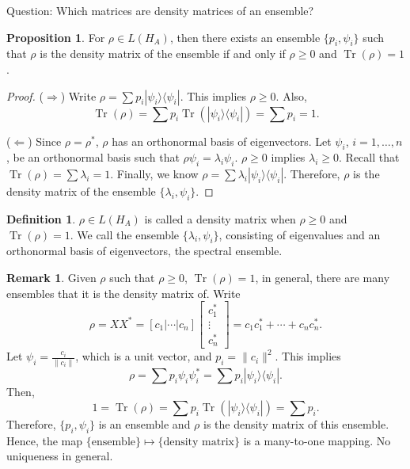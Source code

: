 \documentclass[12pt]{article}
\theoremstyle{definition}
\newtheorem*{proposition}{Proposition}
\newtheorem*{definition}{Definition}
\newtheorem*{remark}{Remark}
\newcommand{\ketbra}[2]{|#1\rangle\langle #2|}
\DeclareMathOperator{\Tr}{Tr}
\begin{document}
Question: Which matrices are density matrices of an ensemble?

\begin{proposition}
For $\rho \in L(H_A)$, then there exists an ensemble $\{p_i,\psi_i\}$ such that $\rho$ is the density matrix of the ensemble if and only if $\rho \geq 0$ and $\Tr(\rho) = 1$.
\end{proposition}

\begin{proof}
($\Rightarrow$) Write $\rho = \sum p_i \ketbra{\psi_i}{\psi_i}$. This implies $\rho \geq 0$. Also,
\[
\Tr(\rho) = \sum p_i \Tr(\ketbra{\psi_i}{\psi_i}) = \sum p_i = 1.
\]

($\Leftarrow$) Since $\rho = \rho^*$, $\rho$ has an orthonormal basis of eigenvectors. Let $\psi_i$, $i = 1,\ldots,n$, be an orthonormal basis such that $\rho\psi_i = \lambda_i\psi_i$. $\rho \geq 0$ implies $\lambda_i \geq 0$. Recall that $\Tr(\rho) = \sum \lambda_i = 1$. Finally, we know $\rho = \sum \lambda_i \ketbra{\psi_i}{\psi_i}$. Therefore, $\rho$ is the density matrix of the ensemble $\{\lambda_i,\psi_i\}$.
\end{proof}

\begin{definition}
$\rho \in L(H_A)$ is called a density matrix when $\rho \geq 0$ and $\Tr(\rho) = 1$. We call the ensemble $\{\lambda_i,\psi_i\}$, consisting of eigenvalues and an orthonormal basis of eigenvectors, the spectral ensemble.
\end{definition}

\begin{remark}
Given $\rho$ such that $\rho \geq 0$, $\Tr(\rho) = 1$, in general, there are many ensembles that it is the density matrix of. Write
\[
\rho = XX^* = [c_1|\cdots|c_n]\begin{bmatrix}c_1^*\\ \vdots \\ c_n^*\end{bmatrix} = c_1c_1^* + \cdots + c_nc_n^*.
\]
Let $\psi_i = \frac{c_i}{\|c_i\|}$, which is a unit vector, and $p_i = \|c_i\|^2$. This implies
\[
\rho = \sum p_i \psi_i\psi_i^* = \sum p_i \ketbra{\psi_i}{\psi_i}.
\]
Then,
\[
1 = \Tr(\rho) = \sum p_i \Tr(\ketbra{\psi_i}{\psi_i}) = \sum p_i.
\]
Therefore, $\{p_i,\psi_i\}$ is an ensemble and $\rho$ is the density matrix of this ensemble.
Hence, the map $\{\text{ensemble}\} \mapsto \{\text{density matrix}\}$ is a many-to-one mapping. No uniqueness in general.
\end{remark}
\end{document}
